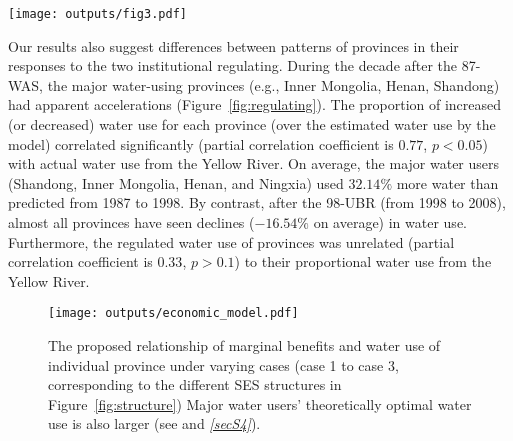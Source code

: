 \documentclass[default, sn-standardnature]{sn-jnl}
\begin{document}
\begin{figure*}[!htb]
	\centering
	\texttt{[image: outputs/fig3.pdf]}
	\caption{
		Regulating differences for provinces in the YRB.
		Red (the 87-WAS) and green (the 98-UBR) bars denote an increased or decreased ratio for actual water use relative to the estimate from the model in the decade after the institutional shift.
		The grey bars indicate the proportions of actual water use for each province relative to their total water use in the decade after the institutional shift.
		The triangles mark the water quotas assigned under the institution, converted to ratios by dividing by their sum.
	}
	\label{fig:regulating}
\end{figure*}

Our results also suggest differences between patterns of provinces in their responses to the two institutional regulating.
During the decade after the 87-WAS, the major water-using provinces (e.g., Inner Mongolia, Henan, Shandong) had apparent accelerations (Figure~\ref{fig:regulating}).
The proportion of increased (or decreased) water use for each province (over the estimated water use by the model) correlated significantly (partial correlation coefficient is $0.77$, $p<0.05$) with actual water use from the Yellow River.
On average, the major water users (Shandong, Inner Mongolia, Henan, and Ningxia) used $32.14\%$ more water than predicted from 1987 to 1998.
By contrast, after the 98-UBR (from 1998 to 2008), almost all provinces have seen declines ($-16.54\%$ on average) in water use.
Furthermore, the regulated water use of provinces was unrelated (partial correlation coefficient is $0.33$, $p>0.1$) to their proportional water use from the Yellow River.




\begin{figure}[!htb]
	\centering
	\texttt{[image: outputs/economic\_model.pdf]}
	\caption{
		The proposed relationship of marginal benefits and water use of individual province under varying cases (case 1 to case 3, corresponding to the different SES structures in Figure~\ref{fig:structure}) Major water users' theoretically optimal water use is also larger (see  and \textit{\ref{secS4}}).}
	\label{fig:model}
\end{figure}
\end{document}
